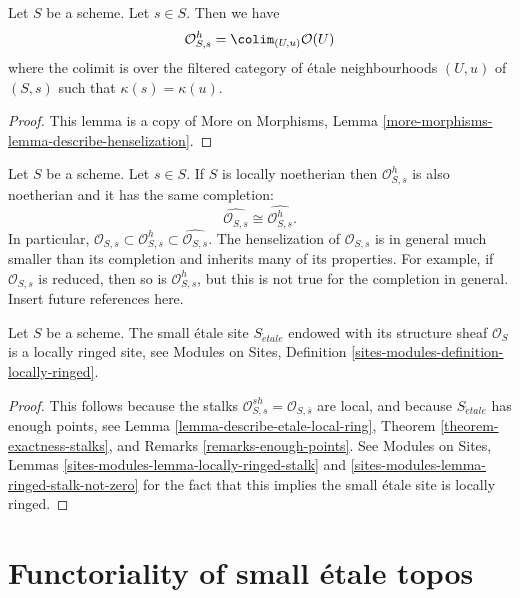 \begin{lemma}
\label{lemma-describe-henselization}
Let $S$ be a scheme. Let $s \in S$. Then we have
$$
\mathcal{O}_{S, s}^h =
\colim_{(U, u)} \mathcal{O}(U)
$$
where the colimit is over the filtered category of
\'etale neighbourhoods $(U, u)$ of $(S, s)$ such that
$\kappa(s) = \kappa(u)$.
\end{lemma}

\begin{proof}
This lemma is a copy of
More on Morphisms, Lemma \ref{more-morphisms-lemma-describe-henselization}.
\end{proof}

\begin{remark}
\label{remark-henselization-Noetherian}
Let $S$ be a scheme. Let $s \in S$.
If $S$ is locally noetherian then $\mathcal{O}_{S, s}^h$
is also noetherian and it has the same completion:
$$
\widehat{\mathcal{O}_{S, s}} \cong \widehat{\mathcal{O}_{S, s}^h}.
$$
In particular,
$\mathcal{O}_{S, s} \subset
\mathcal{O}_{S, s}^h \subset
\widehat{\mathcal{O}_{S, s}}$.
The henselization of $\mathcal{O}_{S, s}$ is in general much
smaller than its completion and inherits many of its properties.
For example, if $\mathcal{O}_{S, s}$ is reduced, then so is
$\mathcal{O}_{S, s}^h$, but this is not true for the completion in general.
Insert future references here.
\end{remark}

\begin{lemma}
\label{lemma-etale-site-locally-ringed}
Let $S$ be a scheme. The small \'etale site $S_{\acute{e}tale}$ endowed with
its structure sheaf $\mathcal{O}_S$ is a locally ringed site, see
Modules on Sites, Definition \ref{sites-modules-definition-locally-ringed}.
\end{lemma}

\begin{proof}
This follows because the stalks
$\mathcal{O}_{S, s}^{sh} = \mathcal{O}_{S, \overline{s}}$ are
local, and because $S_{\acute{e}tale}$ has enough points, see
Lemma \ref{lemma-describe-etale-local-ring},
Theorem \ref{theorem-exactness-stalks},
and
Remarks \ref{remarks-enough-points}.
See
Modules on Sites, Lemmas \ref{sites-modules-lemma-locally-ringed-stalk} and
\ref{sites-modules-lemma-ringed-stalk-not-zero}
for the fact that this implies the small \'etale site is locally ringed.
\end{proof}






\section{Functoriality of small \'etale topos}
\label{section-functoriality}


